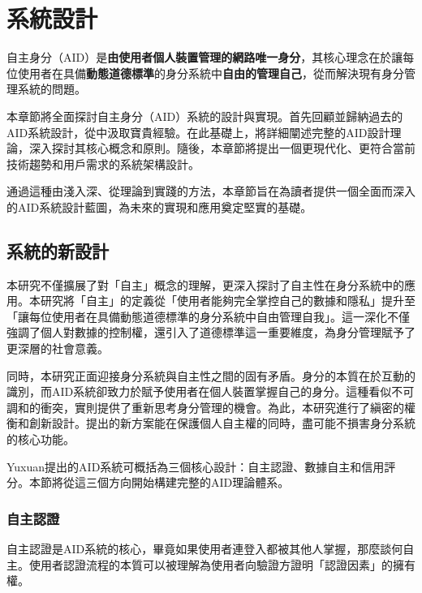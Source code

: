 
\chapter{系統設計}
自主身分（AID）是\textbf{由使用者個人裝置管理的網路唯一身分}，其核心理念在於讓每位使用者在具備\textbf{動態道德標準}的身分系統中\textbf{自由的管理自己}，從而解決現有身分管理系統的問題。

本章節將全面探討自主身分（AID）系統的設計與實現。首先回顧並歸納過去的AID系統設計，從中汲取寶貴經驗。在此基礎上，將詳細闡述完整的AID設計理論，深入探討其核心概念和原則。隨後，本章節將提出一個更現代化、更符合當前技術趨勢和用戶需求的系統架構設計。

通過這種由淺入深、從理論到實踐的方法，本章節旨在為讀者提供一個全面而深入的AID系統設計藍圖，為未來的實現和應用奠定堅實的基礎。
\section{系統的新設計}
本研究不僅擴展了對「自主」概念的理解，更深入探討了自主性在身分系統中的應用。本研究將「自主」的定義從「使用者能夠完全掌控自己的數據和隱私」提升至「讓每位使用者在具備動態道德標準的身分系統中自由管理自我」。這一深化不僅強調了個人對數據的控制權，還引入了道德標準這一重要維度，為身分管理賦予了更深層的社會意義。

同時，本研究正面迎接身分系統與自主性之間的固有矛盾。身分的本質在於互動的識別，而AID系統卻致力於賦予使用者在個人裝置掌握自己的身分。這種看似不可調和的衝突，實則提供了重新思考身分管理的機會。為此，本研究進行了縝密的權衡和創新設計。提出的新方案能在保護個人自主權的同時，盡可能不損害身分系統的核心功能。

Yuxuan\cite{ntu-lin2014autonomous}提出的AID系統可概括為三個核心設計：自主認證、數據自主和信用評分。本節將從這三個方向開始構建完整的AID理論體系。
\subsection{自主認證}
自主認證是AID系統的核心，畢竟如果使用者連登入都被其他人掌握，那麼談何自主。使用者認證流程的本質可以被理解為使用者向驗證方證明「認證因素」\cite{AlQahtani2021AF}的擁有權。
